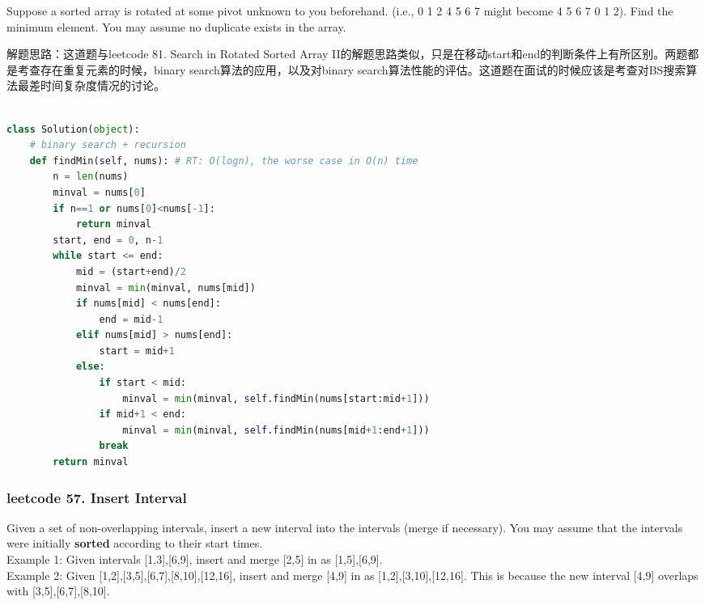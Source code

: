 \documentclass[a4paper,10pt]{article}
\begin{document}
\noindent Suppose a sorted array is rotated at some pivot unknown to you beforehand. (i.e., 0 1 2 4 5 6 7 might become 4 5 6 7 0 1 2). Find the minimum element. You may assume no duplicate exists in the array. \\

\begin{CJK*}{UTF8}{gbsn}
\noindent 解题思路：这道题与leetcode 81. Search in Rotated Sorted Array II的解题思路类似，只是在移动start和end的判断条件上有所区别。两题都是考查存在重复元素的时候，binary search算法的应用，以及对binary search算法性能的评估。这道题在面试的时候应该是考查对BS搜索算法最差时间复杂度情况的讨论。
\end{CJK*}

\begin{lstlisting}[language=Python, caption=Problem154. Find Minimum in Rotated Sorted Array II]

class Solution(object):
    # binary search + recursion
    def findMin(self, nums): # RT: O(logn), the worse case in O(n) time
        n = len(nums)
        minval = nums[0]
        if n==1 or nums[0]<nums[-1]:
            return minval
        start, end = 0, n-1
        while start <= end:
            mid = (start+end)/2
            minval = min(minval, nums[mid])
            if nums[mid] < nums[end]:
                end = mid-1
            elif nums[mid] > nums[end]:
                start = mid+1
            else:
                if start < mid:
                    minval = min(minval, self.findMin(nums[start:mid+1]))
                if mid+1 < end:
                    minval = min(minval, self.findMin(nums[mid+1:end+1]))
                break
        return minval
\end{lstlisting}


\subsubsection{leetcode 57. Insert Interval}
Given a set of non-overlapping intervals, insert a new interval into the intervals (merge if necessary). You may assume that the intervals were initially \textbf{sorted} according to their start times. \\

\noindent Example 1: Given intervals [1,3],[6,9], insert and merge [2,5] in as [1,5],[6,9]. \\

\noindent Example 2: Given [1,2],[3,5],[6,7],[8,10],[12,16], insert and merge [4,9] in as [1,2],[3,10],[12,16]. This is because the new interval [4,9] overlaps with [3,5],[6,7],[8,10]. \\
\end{document}
